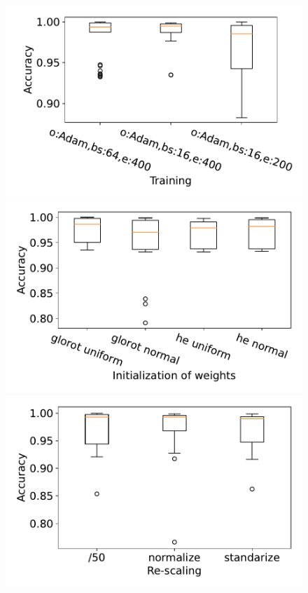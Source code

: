 \documentclass[prl,twocolumn]{revtex4-1}
\begin{document}
\begin{figure}[!tb]
  \hskip 0.5mm
  \includegraphics[width=\figwidth]{task_1/figures/training_box_30_.pdf}
  \vskip 0.5mm
  \includegraphics[width=\figwidth]{task_1/figures/init_weights_box_30_2.pdf}
  \hskip 0.5mm
  \includegraphics[width=\figwidth]{task_1/figures/rescale_box_30_2.pdf}

\end{figure}
\end{document}
